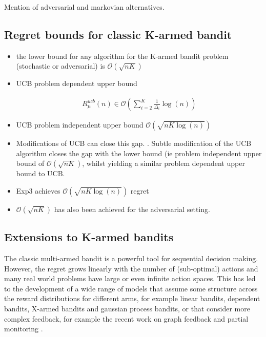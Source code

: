 \documentclass[11pt,a4paper]{article}
\newcommand{\eqn}[1]{\begin{align}#1\end{align}}
\newcommand{\bigo}[1]{\mathcal{O}\left( #1 \right)}
\begin{document}
Mention of adversarial and markovian alternatives.

\subsection{Regret bounds for classic K-armed bandit}

\begin{itemize}
\item the lower bound for any algorithm for the K-armed bandit problem (stochastic or adversarial) is $\bigo{\sqrt{nK}}$ \cite{Auer1995}

\item UCB problem dependent upper bound \cite{Auer2002} 

\eqn {
R^{ucb}_\mu(n) \in \bigo{\sum_{i=2}^K \frac{1}{\Delta_i}\log(n)}
}
\item UCB problem independent upper bound $\bigo{\sqrt{nK\log(n)}}$ \cite{Bubeck2012}

\item Modifications of UCB can close this gap. \cite{Lattimore2015, Audibert2009}. Subtle modification of the UCB algorithm closes the gap with the lower bound (ie problem independent upper bound of $\bigo{\sqrt{nK}}$, whilst yielding a similar problem dependent upper bound to UCB. \cite{Lattimore2015}

\item Exp3 achieves $\bigo{\sqrt{nK\log(n)}}$ regret \cite{Auer1995}

\item $\bigo{\sqrt{nK}}$ has also been achieved for the adversarial setting. \cite{Audibert2009}
  
\end{itemize}


\subsection{Extensions to K-armed bandits}

The classic multi-armed bandit is a powerful tool for sequential decision making. However, the regret grows linearly with the number of (sub-optimal) actions and many real world problems have large or even infinite action spaces. This has led to the development of a wide range of models that assume some structure across the reward distributions for different arms, for example linear bandits, dependent bandits, X-armed bandits and gaussian process bandits, or that consider more complex feedback, for example the recent work on graph feedback \cite{Mannor2011,Lelarge2012,Alon2013,Buccapatnam2014,Kocak2014,Alon2015} and partial monitoring \cite{Piccolboni2001,Bartok2014}. 
\end{document}

